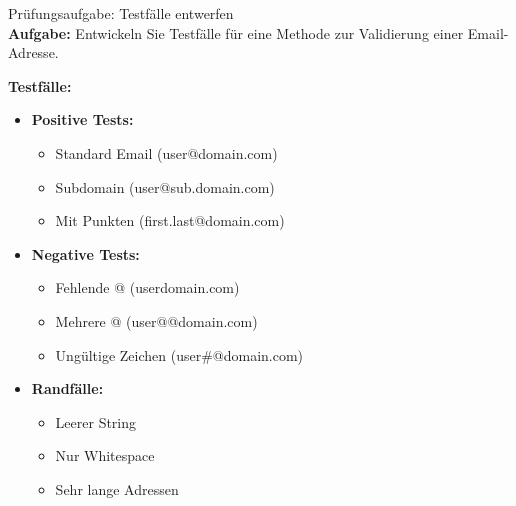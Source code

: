 \begin{example2}{Prüfungsaufgabe: Testfälle entwerfen}\\
\textbf{Aufgabe:}
Entwickeln Sie Testfälle für eine Methode zur Validierung einer Email-Adresse.

\textbf{Testfälle:}
\begin{itemize}
    \item \textbf{Positive Tests:}
    \begin{itemize}
        \item Standard Email (user@domain.com)
        \item Subdomain (user@sub.domain.com)
        \item Mit Punkten (first.last@domain.com)
    \end{itemize}
    
    \item \textbf{Negative Tests:}
    \begin{itemize}
        \item Fehlende @ (userdomain.com)
        \item Mehrere @ (user@@domain.com)
        \item Ungültige Zeichen (user\#@domain.com)
    \end{itemize}
    
    \item \textbf{Randfälle:}
    \begin{itemize}
        \item Leerer String
        \item Nur Whitespace
        \item Sehr lange Adressen
    \end{itemize}
\end{itemize}
\end{example2}

